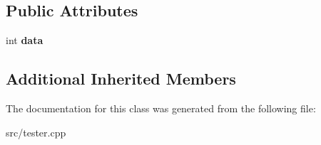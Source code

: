\subsection*{Public Attributes}
\begin{DoxyCompactItemize}
\item 
\mbox{\label{classIntNode_a789f030f33a2de8a1676fce3b6e29006}} 
int {\bfseries data}
\end{DoxyCompactItemize}
\subsection*{Additional Inherited Members}


The documentation for this class was generated from the following file\+:\begin{DoxyCompactItemize}
\item 
src/tester.\+cpp\end{DoxyCompactItemize}

